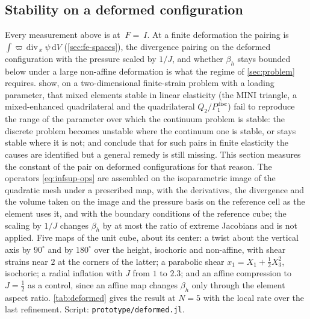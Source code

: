 \documentclass{article}
\newcommand{\F}{~F}
\newcommand{\Id}{~I}
\newcommand{\testd}{~\psi}
\newcommand{\bx}{~x}
\newcommand{\diff}{\,\mathrm{d}}
\newcommand{\code}[1]{\texttt{#1}}
\theoremstyle{definition}
\theoremstyle{plain}
\begin{document}
\subsection{Stability on a deformed configuration}
\label{sec:deformed}

Every measurement above is at $\F = \Id$. At a finite deformation the
pairing is $\int \varpi\,\mathrm{div}_{\bx}\testd \diff V$ (\cref{sec:fe-spaces}),
the divergence pairing on the deformed configuration with the pressure scaled
by $1/J$, and whether $\beta_h$ stays bounded below under a large non-affine
deformation is what the regime of \cref{sec:problem} requires.
\textcite{Auricchio.etal:2005} show, on a two-dimensional finite-strain problem
with a loading parameter, that mixed elements stable in linear elasticity
(the MINI triangle, a mixed-enhanced quadrilateral and the quadrilateral
$Q_2/P_1^{\mathrm{disc}}$) fail to reproduce the range of the parameter over
which the continuum problem is stable: the discrete problem becomes unstable
where the continuum one is stable, or stays stable where it is not; and
\textcite{Auricchio.etal:2013} conclude that for such pairs in finite elasticity
the causes are identified but a general remedy is still missing.  This
section measures the constant of the pair on deformed configurations for
that reason. The operators
\eqref{eq:infsup-ops} are assembled on the isoparametric image of the
quadratic mesh under a prescribed map, with the derivatives, the divergence
and the volume taken on the image and the pressure basis on the reference
cell as the element uses it, and with the boundary conditions of the
reference cube; the scaling by $1/J$ changes $\beta_h$ by at most the ratio
of extreme Jacobians and is not applied. Five maps of the unit cube, about
its center: a twist about the vertical axis by $90^\circ$ and by $180^\circ$
over the height, isochoric and non-affine, with shear strains near $2$ at the
corners of the latter; a parabolic shear $x_1 = X_1 + \tfrac12 X_3^2$,
isochoric; a radial inflation with $J$ from $1$ to $2.3$; and an affine
compression to $J = \tfrac12$ as a control, since an affine map changes
$\beta_h$ only through the element aspect ratio. \cref{tab:deformed}
gives the result at $N = 5$ with the local rate over the last refinement.
Script: \code{prototype/deformed.jl}.
\end{document}
